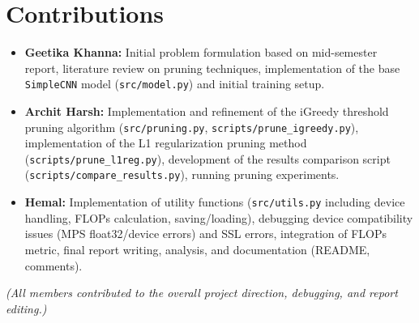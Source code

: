\documentclass[10pt, article]{article} %
\begin{document}
\section{Contributions}
\begin{itemize}
    \item \textbf{Geetika Khanna:} Initial problem formulation based on mid-semester report, literature review on pruning techniques, implementation of the base \texttt{SimpleCNN} model (\texttt{src/model.py}) and initial training setup.
    \item \textbf{Archit Harsh:} Implementation and refinement of the iGreedy threshold pruning algorithm (\texttt{src/pruning.py}, \texttt{scripts/prune\_igreedy.py}), implementation of the L1 regularization pruning method (\texttt{scripts/prune\_l1reg.py}), development of the results comparison script (\texttt{scripts/compare\_results.py}), running pruning experiments.
    \item \textbf{Hemal:} Implementation of utility functions (\texttt{src/utils.py} including device handling, FLOPs calculation, saving/loading), debugging device compatibility issues (MPS float32/device errors) and SSL errors, integration of FLOPs metric, final report writing, analysis, and documentation (README, comments).
\end{itemize}
\textit{(All members contributed to the overall project direction, debugging, and report editing.)}

\end{document}
